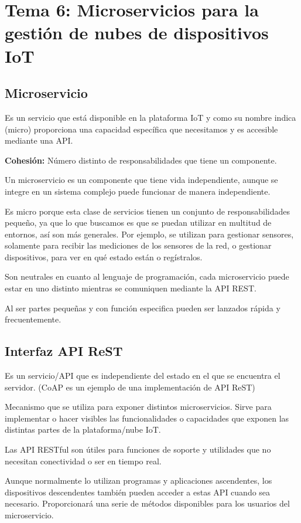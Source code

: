 \documentclass[12pt, twoside, openright]{report} %
\begin{document}
\chapter{Tema 6: Microservicios para la gestión de nubes de dispositivos IoT}
\section{Microservicio}
Es un servicio que está disponible en la plataforma IoT y como su nombre indica (micro) proporciona una capacidad específica que necesitamos y es accesible mediante una API.

\textbf{Cohesión:} Número distinto de responsabilidades que tiene un componente.

Un microservicio es un componente que tiene vida independiente, aunque se integre en un sistema complejo puede funcionar de manera independiente.

Es micro porque esta clase de servicios tienen un conjunto de responsabilidades pequeño, ya que lo que buscamos es que se puedan utilizar en multitud de entornos, así son más generales. Por ejemplo, se utilizan para gestionar sensores, solamente para recibir las mediciones de los sensores de la red, o gestionar dispositivos, para ver en qué estado están o regístralos.

Son neutrales en cuanto al lenguaje de programación, cada microservicio puede estar en uno distinto mientras se comuniquen mediante la API REST.

Al ser partes pequeñas y con función especifica pueden ser lanzados rápida y frecuentemente.

\section{Interfaz API ReST}
Es un servicio/API que es independiente del estado en el que se encuentra el servidor. (CoAP es un ejemplo de una implementación de API ReST)

Mecanismo que se utiliza para exponer distintos microservicios. Sirve para implementar o hacer visibles las funcionalidades o capacidades que exponen las distintas partes de la plataforma/nube IoT.

Las API RESTful son útiles para funciones de soporte y utilidades que no necesitan conectividad o ser en tiempo real.

Aunque normalmente lo utilizan programas y aplicaciones ascendentes, los dispositivos descendentes también pueden acceder a estas API cuando sea necesario. Proporcionará una serie de métodos disponibles para los usuarios del microservicio.
\end{document}

